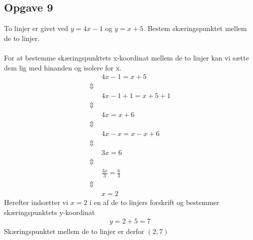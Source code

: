 \subsection{Opgave 9}

To linjer er givet ved $y = 4x -1$ og $y = x  + 5$. Bestem skæringspunktet mellem de to linjer.\\\\


\ans
For at bestemme skæringspunktets x-koordinat mellem de to linjer kan vi sætte dem lig med hinanden og isolere for x.
\begin{align*}
    &4x -1 = x + 5\\
    \Updownarrow \; &\\
    &4x -1 + 1 = x + 5 + 1\\
    \Updownarrow \; &\\
    &4x = x + 6\\
    \Updownarrow \; &\\
    &4x - x = x - x + 6\\
    \Updownarrow \; &\\
    &3x = 6\\
    \Updownarrow \; &\\
    &\frac{3x}{3} = \frac{6}{3}\\
    \Updownarrow \; &\\
    &x = 2
\end{align*}
Herefter indsætter vi $x = 2$ i en af de to linjers forskrift og bestemmer skæringspunktets y-koordinat
\begin{align*}
    y = 2 + 5 = 7
\end{align*}
Skæringspunktet mellem de to linjer er derfor $(2,7)$